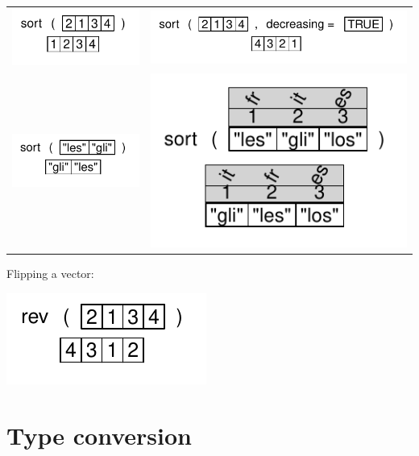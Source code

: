 \documentclass[pdflatex]{article}
\begin{document}
\begin{tabular}{cc}
\includegraphics{sort} & \includegraphics{sort2}\\
\includegraphics{sort_char} & \includegraphics{sort_char_names} \\
\end{tabular}

Flipping a vector:

\includegraphics{rev}

\section{Type conversion}
\end{document}
